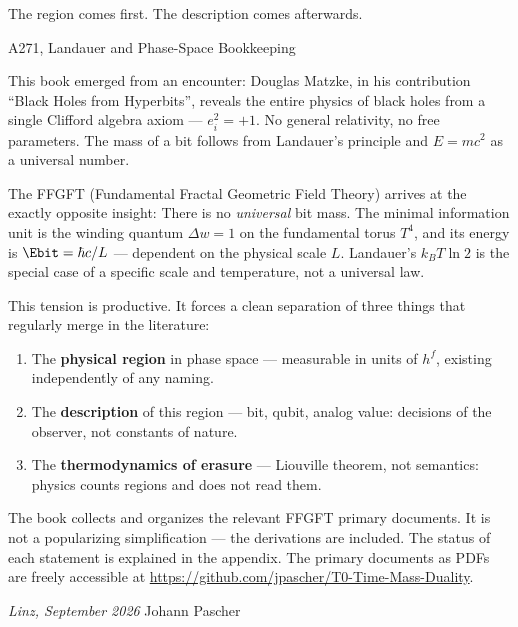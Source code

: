 \epigraph{The region comes first. The description comes afterwards.}{A271, Landauer and Phase-Space Bookkeeping}

This book emerged from an encounter: Douglas Matzke, in his contribution
\enquote{Black Holes from Hyperbits}, reveals the entire physics of black holes from a
single Clifford algebra axiom --- $e_i^2 = +1$. No general relativity, no free
parameters. The mass of a bit follows from Landauer's principle and $E = mc^2$
as a universal number.

The FFGFT (Fundamental Fractal Geometric Field Theory) arrives at the exactly
opposite insight: There is no \emph{universal} bit mass. The
minimal information unit is the winding quantum $\Delta w = 1$ on the
fundamental torus $T^4$, and its energy is $\Ebit = \hbar c / L$ ---
dependent on the physical scale $L$. Landauer's $k_B T \ln 2$ is the
special case of a specific scale and temperature, not a universal law.

This tension is productive. It forces a clean separation of three things
that regularly merge in the literature:
\begin{enumerate}
  \item The \textbf{physical region} in phase space --- measurable in units of
    $h^f$, existing independently of any naming.
  \item The \textbf{description} of this region --- bit, qubit, analog value:
    decisions of the observer, not constants of nature.
  \item The \textbf{thermodynamics of erasure} --- Liouville theorem, not semantics:
    physics counts regions and does not read them.
\end{enumerate}

The book collects and organizes the relevant FFGFT primary documents. It is
not a popularizing simplification --- the derivations are included. The
status of each statement is explained in the appendix. The primary documents as PDFs are freely
accessible at \url{https://github.com/jpascher/T0-Time-Mass-Duality}.

\bigskip
\noindent
\textit{Linz, September 2026} \hfill Johann Pascher